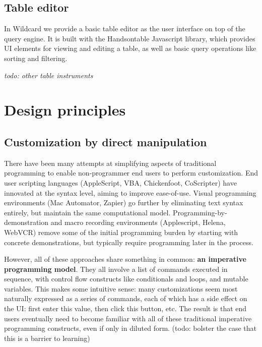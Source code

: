 \documentclass[sigplan,10pt,anonymous,review]{acmart}
\begin{document}
\hypertarget{table-editor}{%
\subsection{Table editor}\label{table-editor}}

In Wildcard we provide a basic table editor as the user interface on top
of the query engine. It is built with the Handsontable Javascript
library, which provides UI elements for viewing and editing a table, as
well as basic query operations like sorting and filtering.

\emph{todo: other table instruments}

\hypertarget{sec:design-principles}{%
\section{Design principles}\label{sec:design-principles}}

\hypertarget{customization-by-direct-manipulation}{%
\subsection{Customization by direct
manipulation}\label{customization-by-direct-manipulation}}

There have been many attempts at simplifying aspects of traditional
programming to enable non-programmer end users to perform customization.
End user scripting languages (AppleScript, VBA, Chickenfoot, CoScripter)
have innovated at the syntax level, aiming to improve ease-of-use.
Visual programming environments (Mac Automator, Zapier) go further by
eliminating text syntax entirely, but maintain the same computational
model. Programming-by-demonstration and macro recording environments
(Applescript, Helena, WebVCR) remove some of the initial programming
burden by starting with concrete demonstrations, but typically require
programming later in the process.

However, all of these approaches share something in common: \textbf{an
imperative programming model}. They all involve a list of commands
executed in sequence, with control flow constructs like conditionals and
loops, and mutable variables. This makes some intuitive sense: many
customizations seem most naturally expressed as a series of commands,
each of which has a side effect on the UI: first enter this value, then
click this button, etc. The result is that end users eventually need to
become familiar with all of these traditional imperative programming
constructs, even if only in diluted form. (todo: bolster the case that
this is a barrier to learning)
\end{document}
